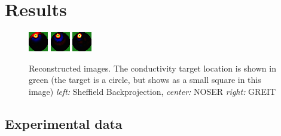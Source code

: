 \documentclass[12pt]{iopart}
\begin{document}
\section{Results}

\begin{figure}[bhtp]
\begin{center}
  \includegraphics[width= 0.2 \textwidth]
         {../../tutorial/GREIT-evaluation/simulation_test_imgs/simulation_test03_1.png}
  \includegraphics[width= 0.2 \textwidth]
         {../../tutorial/GREIT-evaluation/simulation_test_imgs/simulation_test03_2.png}
  \includegraphics[width= 0.2 \textwidth]
         {../../tutorial/GREIT-evaluation/simulation_test_imgs/simulation_test03_4.png}
\caption{ \label{fig:rimage}
Reconstructed images. The conductivity target location is shown in green (the target is a circle, but shows as a small square in this image)
{\em left:} Sheffield Backprojection,
{\em center:} NOSER
{\em right:} GREIT
}
\end{center}
\end{figure}

\subsection{Experimental data}
\end{document}
